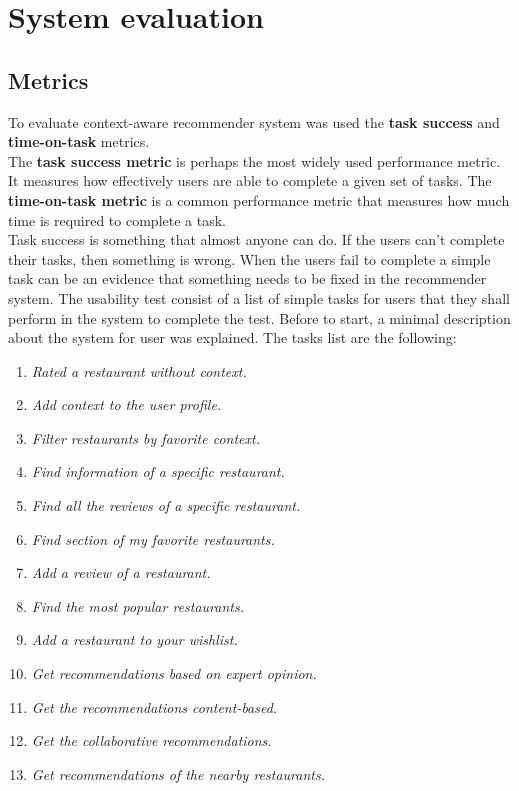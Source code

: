 \chapter{System evaluation} \label{evaluation}

\section{Metrics}

To evaluate context-aware recommender system was used the \textbf{task success}
and \textbf{time-on-task} metrics. \\ The \textbf{task success metric} is
perhaps the most widely used performance metric. It measures how effectively
users are able to complete a given set of tasks.  The \textbf{time-on-task
metric} is a common performance metric that measures how much time is required
to complete a task\cite{albert2013measuring}.\\ Task success is something that
almost anyone can do.  If the users can’t complete their tasks, then something
is wrong.  When the users fail to complete a simple task can be an evidence that
something needs to be fixed in the recommender system.  The usability test
consist of a list of simple tasks for users that they shall perform in the
system to complete the test. Before to start, a minimal description about the
system for user was explained. The tasks list are the following:
\begin{enumerate} 
\item \textit{Rated a restaurant without context.}
\item \textit{Add context to the user profile.}
\item \textit{Filter restaurants by favorite context.}
\item \textit{Find information of a specific restaurant.}
\item \textit{Find all the reviews of a specific restaurant.} 
\item \textit{Find section of my favorite restaurants.}
\item \textit{Add a review of a restaurant.}
\item \textit{Find the most popular restaurants.}
\item \textit{Add a restaurant to your wishlist.}
\item \textit{Get recommendations based on expert opinion.} 
\item \textit{Get the recommendations content-based.}
\item \textit{Get the collaborative recommendations.}
\item \textit{Get recommendations of the nearby restaurants.}
\end{enumerate} 

